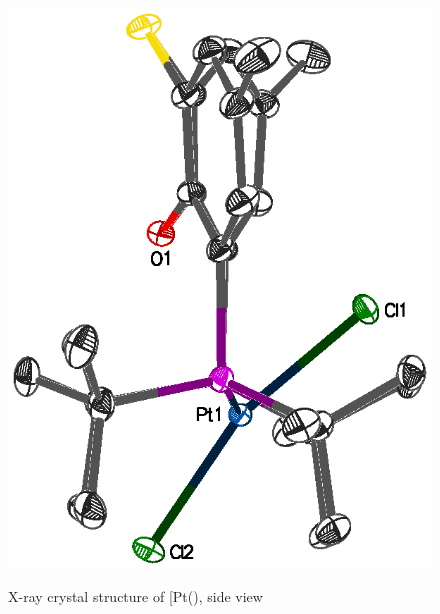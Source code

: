 \begin{figure}[htbp]
\begin{center}
\vspace{0.5cm}
\includegraphics[scale=0.8]{../Figures/Crystalthixantphosplatinumdichlorideside.eps}
\caption[X-ray crystal structure of [Pt(\tButhixantphos)\ce{Cl2]}, side view]{X-ray crystal structure of [Pt(\tButhixantphos)\ce{Cl2]}, side view}
\vspace{0.2cm}
\label{crystalthixantphosplatinumdichlorideside}
\end{center}
\end{figure}
\vspace{0.2cm}

